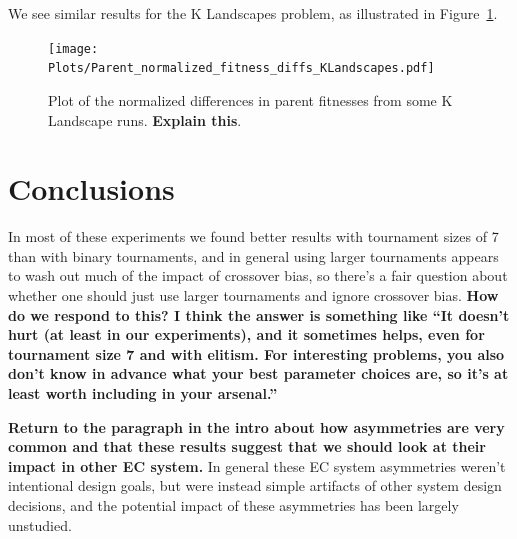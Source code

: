 \documentclass{sig-alternate}
\begin{document}
We see similar results for the K Landscapes problem, as illustrated in Figure~\ref{fig:parentDiffsKLandscapes}.

\begin{figure}
\centering
\texttt{[image: Plots/Parent\_normalized\_fitness\_diffs\_KLandscapes.pdf]}
\caption{Plot of the normalized differences in parent fitnesses from some K Landscape runs. \textbf{Explain this}.}
\label{fig:parentDiffsKLandscapes}
\end{figure}

\section{Conclusions} \label{sec:Conclusions}

In most of these experiments we found better results with tournament sizes of 7 than with binary tournaments, and in 
general using larger tournaments appears to wash out much of the impact of crossover bias, so there's a fair question 
about whether one should just use larger tournaments and ignore crossover bias. \textbf{How do we respond to this? I 
think the answer is something like ``It doesn't hurt (at least in our experiments), and it sometimes helps, even for 
tournament size 7 and with elitism. For interesting problems, you also don't know in advance what your best parameter 
choices are, so it's at least worth including in your arsenal.''}

\textbf{Return to the paragraph in the intro about how asymmetries are very common and that these results suggest that we should look at their impact in other EC system.}
In general these 
EC system
asymmetries weren't intentional design goals, but were instead simple artifacts of other system design decisions, and 
the potential impact of these asymmetries has been largely unstudied.






\end{document}
